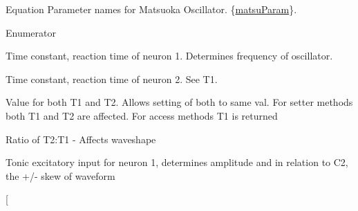 Equation Parameter names for Matsuoka Oscillator. \{\hyperlink{classMatsuNode_aed801e1d0363292efc99bb02f1911386}{matsu\+Param}\}. 

\begin{Desc}
\item[Enumerator]\par
\begin{description}
\item[{\em 
T1\hypertarget{classMatsuNode_aed801e1d0363292efc99bb02f1911386ace499dea30cfce118f4fe85da0227e83}{}\label{classMatsuNode_aed801e1d0363292efc99bb02f1911386ace499dea30cfce118f4fe85da0227e83}
}]Time constant, reaction time of neuron 1. Determines frequency of oscillator. \item[{\em 
T2\hypertarget{classMatsuNode_aed801e1d0363292efc99bb02f1911386a71d2c46af01feeea54a0f541243e297b}{}\label{classMatsuNode_aed801e1d0363292efc99bb02f1911386a71d2c46af01feeea54a0f541243e297b}
}]Time constant, reaction time of neuron 2. See T1. \item[{\em 
T\hypertarget{classMatsuNode_aed801e1d0363292efc99bb02f1911386ab9ece18c950afbfa6b0fdbfa4ff731d3}{}\label{classMatsuNode_aed801e1d0363292efc99bb02f1911386ab9ece18c950afbfa6b0fdbfa4ff731d3}
}]Value for both T1 and T2. Allows setting of both to same val. For setter methods both T1 and T2 are affected. For access methods T1 is returned \item[{\em 
T2\+Over\+T1\hypertarget{classMatsuNode_aed801e1d0363292efc99bb02f1911386a082a8ec4c12853282b09b34982d82a23}{}\label{classMatsuNode_aed801e1d0363292efc99bb02f1911386a082a8ec4c12853282b09b34982d82a23}
}]Ratio of T2\+:T1 -\/ Affects waveshape \item[{\em 
C1\hypertarget{classMatsuNode_aed801e1d0363292efc99bb02f1911386a1a2ddc2db4693cfd16d534cde5572cc1}{}\label{classMatsuNode_aed801e1d0363292efc99bb02f1911386a1a2ddc2db4693cfd16d534cde5572cc1}
}]Tonic excitatory input for neuron 1, determines amplitude and in relation to C2, the +/-\/ skew of waveform \item[{\em 
}
\end{description}
\end{Desc}
